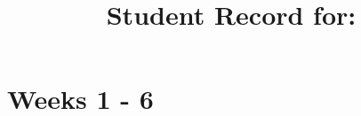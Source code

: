 \documentclass[12pt]{article}
\title{Student Record for: }
\author{}
\date{}
\begin{document}
\maketitle


\section{Weeks 1 - 6}
\end{document}
